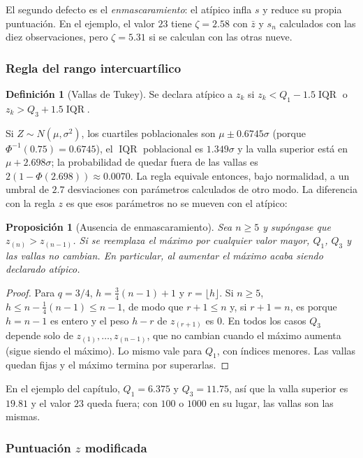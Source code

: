 \documentclass[11pt,a4paper]{article}
\theoremstyle{plain}
\newtheorem{proposicion}[teorema]{Proposición}
\theoremstyle{definition}
\newtheorem{definicion}[teorema]{Definición}
\theoremstyle{remark}
\newcommand{\IQR}{\operatorname{IQR}}
\newcommand{\1}{\mathbf{1}}
\begin{document}
El segundo defecto es el \emph{enmascaramiento}: el atípico infla $s$ y
reduce su propia puntuación. En el ejemplo, el valor $23$ tiene
$\zeta=2.58$ con $\bar z$ y $s_n$ calculados con las diez observaciones,
pero $\zeta=5.31$ si se calculan con las otras nueve.

\subsubsection{Regla del rango intercuartílico}

\begin{definicion}[Vallas de Tukey]
Se declara atípico a $z_k$ si $z_k<Q_1-1.5\IQR$ o $z_k>Q_3+1.5\IQR$.
\end{definicion}

Si $Z\sim N(\mu,\sigma^2)$, los cuartiles poblacionales son
$\mu\pm0.6745\sigma$ (porque $\Phi^{-1}(0.75)=0.6745$), el $\IQR$ poblacional
es $1.349\sigma$ y la valla superior está en $\mu+2.698\sigma$; la
probabilidad de quedar fuera de las vallas es
$2(1-\Phi(2.698))\approx0.0070$. La regla equivale entonces, bajo
normalidad, a un umbral de $2.7$ desviaciones con parámetros calculados de
otro modo. La diferencia con la regla $z$ es que esos parámetros no se
mueven con el atípico:

\begin{proposicion}[Ausencia de enmascaramiento]\label{prop:tukey}
Sea $n\ge5$ y supóngase que $z_{(n)}>z_{(n-1)}$. Si se reemplaza el
máximo por cualquier valor mayor, $Q_1$, $Q_3$ y las vallas no cambian. En
particular, al aumentar el máximo acaba siendo declarado atípico.
\end{proposicion}

\begin{proof}
Para $q=3/4$, $h=\frac34(n-1)+1$ y $r=\lfloor h\rfloor$. Si $n\ge5$,
$h\le n-\frac14(n-1)\le n-1$, de modo que $r+1\le n$ y, si $r+1=n$, es
porque $h=n-1$ es entero y el peso $h-r$ de $z_{(r+1)}$ es $0$. En todos
los casos $Q_3$ depende solo de $z_{(1)},\dots,z_{(n-1)}$, que no cambian
cuando el máximo aumenta (sigue siendo el máximo). Lo mismo vale para
$Q_1$, con índices menores. Las vallas quedan fijas y el máximo termina
por superarlas.
\end{proof}

En el ejemplo del capítulo, $Q_1=6.375$ y $Q_3=11.75$, así que la valla
superior es $19.81$ y el valor $23$ queda fuera; con $100$ o $1000$ en su
lugar, las vallas son las mismas.

\subsubsection{Puntuación $z$ modificada}
\end{document}
